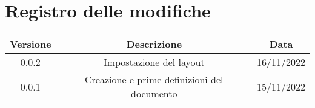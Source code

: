 \section*{Registro delle modifiche}
\begin{center}
\begin{tabular}{ c | c | c } 
 Versione & Descrizione & Data \\
 \hline
 0.0.2 & Impostazione del layout & 16/11/2022 \\
 0.0.1 & Creazione e prime definizioni del documento & 15/11/2022 \\
\end{tabular}
\end{center}
